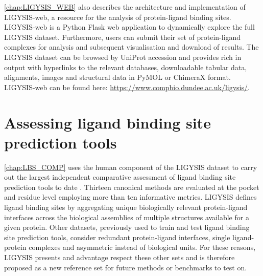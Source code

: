 
\autoref{chap:LIGYSIS_WEB} also describes the architecture and implementation of LIGYSIS-web, a resource for the analysis of protein-ligand binding sites. LIGYSIS-web is a Python Flask web application to dynamically explore the full LIGYSIS dataset. Furthermore, users can submit their set of protein-ligand complexes for analysis and subsequent visualisation and download of results. The LIGYSIS dataset can be browsed by UniProt accession and provides rich in output with hyperlinks to the relevant databases, downloadable tabular data, alignments, images and structural data in PyMOL or ChimeraX format. LIGYSIS-web can be found here: \url{https://www.compbio.dundee.ac.uk/ligysis/}.


\section{Assessing ligand binding site prediction tools}

\autoref{chap:LBS_COMP} uses the human component of the LIGYSIS dataset to carry out the largest independent comparative assessment of ligand binding site prediction tools to date \cite{UTGES_2024_LBSCOMP}. Thirteen canonical methods are evaluated at the pocket and residue level employing more than ten informative metrics. LIGYSIS defines ligand binding sites by aggregating unique biologically relevant protein-ligand interfaces across the biological assemblies of multiple structures available for a given protein. Other datasets, previously used to train and test ligand binding site prediction tools, consider redundant protein-ligand interfaces, single ligand-protein complexes and asymmetric instead of biological units. For these reasons, LIGYSIS presents and advantage respect these other sets and is therefore proposed as a new reference set for future methods or benchmarks to test on.

